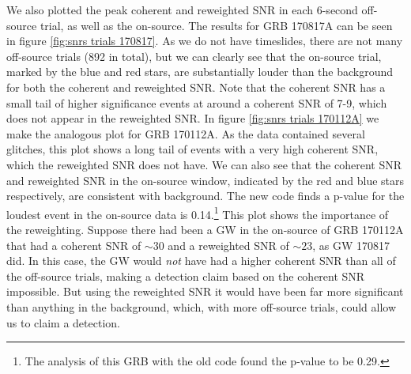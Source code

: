 \documentclass[11pt]{cuthesis}
\begin{document}
We also plotted the peak coherent and reweighted SNR in each 6-second off-source trial, as well as the on-source. The results for GRB 170817A can be seen in figure \ref{fig:snrs trials 170817}. As we do not have timeslides, there are not many off-source trials (892 in total), but we can clearly see that the on-source trial, marked by the blue and red stars, are substantially louder than the background for both the coherent and reweighted SNR. Note that the coherent SNR has a small tail of higher significance events at around a coherent SNR of 7-9, which does not appear in the reweighted SNR. In figure \ref{fig:snrs trials 170112A} we make the analogous plot for GRB 170112A. As the data contained several glitches, this plot shows a long tail of events with a very high coherent SNR, which the reweighted SNR does not have. We can also see that the coherent SNR and reweighted SNR in the on-source window, indicated by the red and blue stars respectively, are consistent with background. The new code finds a p-value for the loudest event in the on-source data is 0.14.\footnote{The analysis of this GRB with the old code found the p-value to be 0.29.} This plot shows the importance of the reweighting. Suppose there had been a GW in the on-source of GRB 170112A that had a coherent SNR of $\sim 30$ and a reweighted SNR of $\sim 23$, as GW 170817 did. In this case, the GW would \textit{not} have had a higher coherent SNR than all of the off-source trials, making a detection claim based on the coherent SNR impossible. But using the reweighted SNR it would have been far more significant than anything in the background, which, with more off-source trials, could allow us to claim a detection. 
\end{document}
